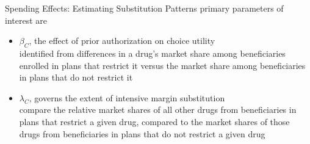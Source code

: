 \begin{frame}{Spending Effects: Estimating Substitution Patterns}
    primary parameters of interest are 
    \begin{itemize}
        \item $\beta_C$, the effect of prior authorization on choice utility \\
        identified from differences in a drug’s market share among beneficiaries enrolled in plans that restrict it versus the market share among beneficiaries in plans that do not restrict it
        \item $\lambda_C$, governs the extent of intensive margin substitution \\
     compare the relative market shares of all other drugs from beneficiaries in plans that restrict a given drug, compared to the market shares of those drugs from beneficiaries in plans that do not restrict a given drug
    \end{itemize}
  

\end{frame}